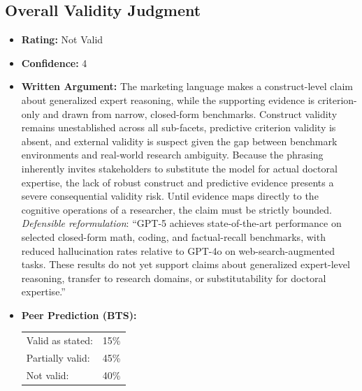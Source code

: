 \subsection{Overall Validity Judgment}
\begin{itemize}
    \item \textbf{Rating:} Not Valid
    \item \textbf{Confidence:} 4
    \item \textbf{Written Argument:} The marketing language makes a construct-level claim about generalized expert reasoning, while the supporting evidence is criterion-only and drawn from narrow, closed-form benchmarks. Construct validity remains unestablished across all sub-facets, predictive criterion validity is absent, and external validity is suspect given the gap between benchmark environments and real-world research ambiguity. Because the phrasing inherently invites stakeholders to substitute the model for actual doctoral expertise, the lack of robust construct and predictive evidence presents a severe consequential validity risk. Until evidence maps directly to the cognitive operations of a researcher, the claim must be strictly bounded. \emph{Defensible reformulation}: ``GPT-5 achieves state-of-the-art performance on selected closed-form math, coding, and factual-recall benchmarks, with reduced hallucination rates relative to GPT-4o on web-search-augmented tasks. These results do not yet support claims about generalized expert-level reasoning, transfer to research domains, or substitutability for doctoral expertise.''
    \item \textbf{Peer Prediction (BTS):}

    \begin{tabular}{ll}
        Valid as stated: & 15\% \\
        Partially valid: & 45\% \\
        Not valid: & 40\% \\
        \end{tabular}\\[4pt]
\end{itemize}
